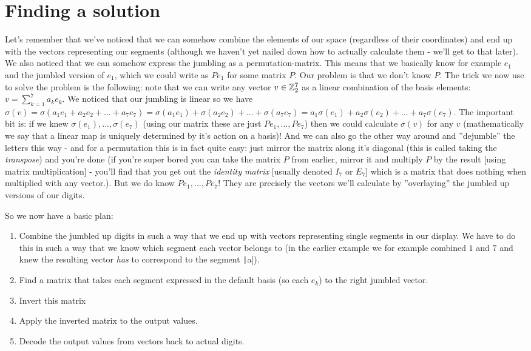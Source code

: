 \documentclass[a4paper,11pt]{article}
\begin{document}
\section{Finding a solution}

Let's remember that we've noticed that we can somehow combine the elements of our space (regardless of their coordinates) and end up with the vectors representing our segments (although we haven't yet nailed down how to actually calculate them - we'll get to that later). We also noticed that we can somehow express the jumbling as a permutation-matrix. This means that we basically know for example $e_1$ and the jumbled version of $e_1$, which we could write as $Pe_1$ for some matrix $P$. Our problem is that we don't know $P$. The trick we now use to solve the problem is the following: note that we can write any vector $v \in \mathbb{Z}_2^7$ as a linear combination of the basis elements: $v=\sum_{k=1}^7 a_k e_k$. We noticed that our jumbling is linear so we have $\sigma(v) = \sigma(a_1e_1 + a_2e_2 + ... + a_7 e_7) = \sigma(a_1e_1) + \sigma(a_2e_2) + ... + \sigma(a_7e_7) = a_1 \sigma(e_1) + a_2\sigma(e_2) + ... + a_7\sigma(e_7)$. The important bit is: if we knew $\sigma(e_1), ..., \sigma(e_7)$ (using our matrix these are just $Pe_1, ..., Pe_7$) then we could calculate $\sigma(v)$ for any $v$ (mathematically we say that a linear map is uniquely determined by it's action on a basis)! And we can also go the other way around and ''dejumble'' the letters this way - and for a permutation this is in fact quite easy: just mirror the matrix along it's diagonal (this is called taking the \emph{transpose}) and you're done (if you're super bored you can take the matrix $P$ from earlier, mirror it and multiply $P$ by the result [using matrix multiplication] - you'll find that you get out the \emph{identity matrix} [usually denoted $I_7$ or $E_7$] which is a matrix that does nothing when multiplied with any vector.).
But we do know $Pe_1, ..., Pe_7$! They are precisely the vectors we'll calculate by ''overlaying'' the jumbled up versions of our digits.

So we now have a basic plan:
\begin{enumerate}
    \item Combine the jumbled up digits in such a way that we end up with vectors representing single segments in our display. We have to do this in such a way that we know which segment each vector belongs to (in the earlier example we for example combined $1$ and $7$ and knew the resulting vector \emph{has} to correspond to the segment \texttt|a|).
    \item Find a matrix that takes each segment expressed in the default basis (so each $e_k$) to the right jumbled vector.
    \item Invert this matrix
    \item Apply the inverted matrix to the output values.
    \item Decode the output values from vectors back to actual digits.
\end{enumerate}
\end{document}

